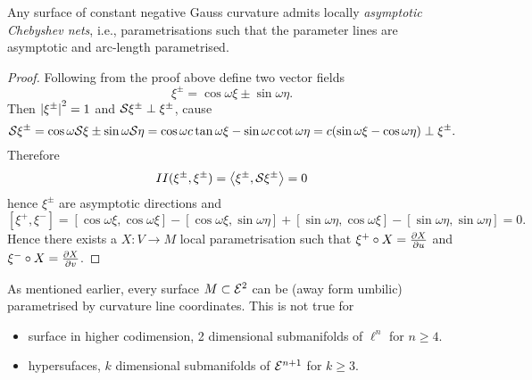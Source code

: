 \begin{corollary}
	Any surface of constant negative Gauss curvature admits locally \emph{asymptotic Chebyshev nets}, i.e., parametrisations such that the parameter lines are asymptotic and arc-length parametrised.
\end{corollary}

\begin{proof}
	Following from the proof above define two vector fields
		\[ \xi^\pm = \cos \omega\xi \pm \sin\omega\eta. \]
	Then $\left| \xi^\pm\right|^2=1$ and $\mathcal S \xi^\pm \perp \xi^\pm$, cause
		\[ \mathcal S \xi^\pm = \cos\omega \mathcal S \xi \pm \sin\omega \mathcal S \eta
			= \cos\omega c \tan \omega \xi - \sin\omega c \cot\omega \eta
				= c(\sin\omega\xi - \cos\omega\eta) \perp \xi^\pm. \]
	Therefore
		\[ II(\xi^\pm, \xi^\pm) = \left \langle \xi^\pm, \mathcal S\xi^\pm \right\rangle = 0 \]
	hence $\xi^\pm$ are asymptotic directions and
		\[ [\xi^+ , \xi^-] = [\cos\omega\xi, \cos\omega\xi]- [\cos\omega\xi,\sin\omega\eta] + [\sin\omega\eta,\cos\omega\xi] - [\sin\omega\eta,\sin\omega\eta]=0. \]
	Hence there exists a $X: V \to M$ local parametrisation such that $\xi^+ \circ X = \frac{\partial X}{\partial u}$ and $\xi^- \circ X = \frac{\partial X}{\partial v}$.
\end{proof}

\begin{remark}
	As mentioned earlier, every surface $M \subset \mathcal E^2$ can be (away form umbilic) parametrised by curvature line coordinates. This is not true for
	\begin{itemize}
		\item surface in higher codimension, 2 dimensional submanifolds of $\ell^n$ for $n\geq 4$.
		\item hypersufaces, $k$ dimensional submanifolds of $\mathcal E^{n+1}$ for $k\geq 3$.
	\end{itemize}
\end{remark}
